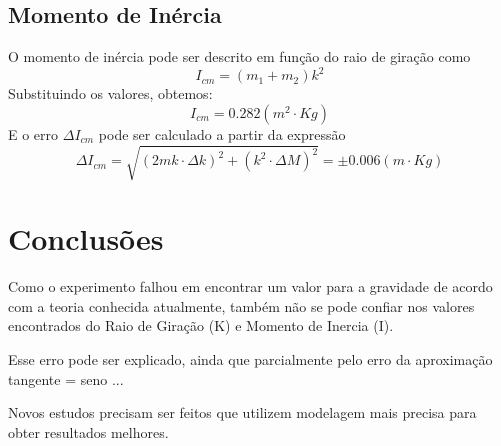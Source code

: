 \documentclass[12pt,a4paper]{article}
\begin{document}
\subsection{Momento de Inércia}
O momento de inércia pode ser descrito em função do raio de giração como 
$$ I_{cm}  = (m_1 + m_2)k^2 $$
Substituindo os valores, obtemos:
$$ I_{cm}  = 0.282 (m^2 \cdot Kg)$$
E o erro $ \Delta I_{cm}$ pode ser calculado a partir da expressão 
$$\Delta I_{cm}  =\sqrt{(2mk \cdot \Delta k)^2 + (k^2 \cdot \Delta M)^2} = \pm 0.006 (m \cdot Kg) $$

\section{Conclusões}
Como o experimento falhou em encontrar um valor para a gravidade de acordo com a teoria conhecida atualmente, também não se pode confiar nos valores encontrados do Raio de Giração (K) e Momento de Inercia (I).

Esse erro pode ser explicado, ainda que parcialmente pelo erro da aproximação tangente = seno ...

Novos estudos precisam ser feitos que utilizem modelagem mais precisa para obter resultados melhores.
\end{document}
